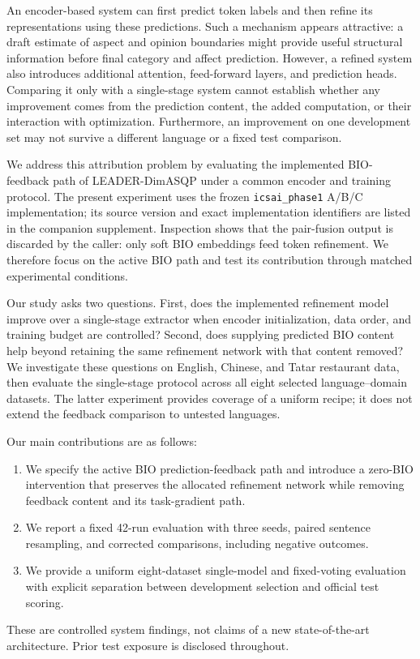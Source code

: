 \documentclass[conference]{IEEEtran}
\begin{document}
An encoder-based system can first predict token labels and then refine its representations using these predictions. Such a mechanism appears attractive: a draft estimate of aspect and opinion boundaries might provide useful structural information before final category and affect prediction. However, a refined system also introduces additional attention, feed-forward layers, and prediction heads. Comparing it only with a single-stage system cannot establish whether any improvement comes from the prediction content, the added computation, or their interaction with optimization. Furthermore, an improvement on one development set may not survive a different language or a fixed test comparison.

We address this attribution problem by evaluating the implemented BIO-feedback path of LEADER-DimASQP under a common encoder and training protocol. The present experiment uses the frozen \texttt{icsai\_phase1} A/B/C implementation; its source version and exact implementation identifiers are listed in the companion supplement. Inspection shows that the pair-fusion output is discarded by the caller: only soft BIO embeddings feed token refinement. We therefore focus on the active BIO path and test its contribution through matched experimental conditions.

Our study asks two questions. First, does the implemented refinement model improve over a single-stage extractor when encoder initialization, data order, and training budget are controlled? Second, does supplying predicted BIO content help beyond retaining the same refinement network with that content removed? We investigate these questions on English, Chinese, and Tatar restaurant data, then evaluate the single-stage protocol across all eight selected language--domain datasets. The latter experiment provides coverage of a uniform recipe; it does not extend the feedback comparison to untested languages.

Our main contributions are as follows:
\begin{enumerate}
\renewcommand{\labelenumi}{(\arabic{enumi})}
\item We specify the active BIO prediction-feedback path and introduce a zero-BIO intervention that preserves the allocated refinement network while removing feedback content and its task-gradient path.
\item We report a fixed 42-run evaluation with three seeds, paired sentence resampling, and corrected comparisons, including negative outcomes.
\item We provide a uniform eight-dataset single-model and fixed-voting evaluation with explicit separation between development selection and official test scoring.
\end{enumerate}
These are controlled system findings, not claims of a new state-of-the-art architecture. Prior test exposure is disclosed throughout.
\end{document}

